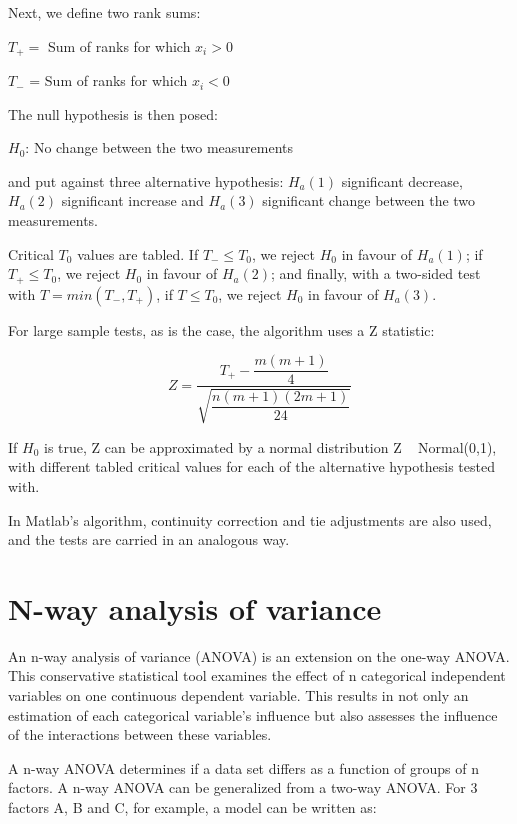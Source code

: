 Next, we define two rank sums:

$T_+ =$ Sum of ranks for which $x_i>0$

$T_-$ = Sum of ranks for which $x_i<0$

The null hypothesis is then posed:

\begin{center}
$H_0$: No change between the two measurements
\end{center} 

and put against three alternative hypothesis: $H_a(1)$ significant decrease, $H_a(2)$ significant increase and $H_a(3)$ significant change between the two measurements.

Critical $T_0$ values are tabled. If $T_- \leq T_0$, we reject $H_0$ in favour of $H_a(1)$; if $T_+ \leq T_0$, we reject $H_0$ in favour of $H_a(2)$; and finally, with a two-sided test with $T=min(T_-, T_+)$, if  $T \leq T_0$, we reject $H_0$ in favour of $H_a(3)$.

For large sample tests, as is the case, the algorithm uses a Z statistic:

\begin{equation}
Z = \dfrac{T_+ - \dfrac{m(m+1)}{4}}{\sqrt{\dfrac{n(m+1)(2m+1)}{24}}}
\end{equation}

If $H_0$ is true, Z can be approximated by a normal distribution Z ~ Normal(0,1), with different tabled critical values for each of the alternative hypothesis tested with.

In Matlab's algorithm, continuity correction and tie adjustments are also used, and the tests are carried in an analogous way.

\section{N-way analysis of variance}
\label{subsec:subcsectionC}

An n-way analysis of variance (ANOVA) is an extension on the one-way ANOVA. This conservative statistical tool examines the effect of n categorical independent variables on one continuous dependent variable. This results in not only an estimation of each categorical variable's influence but also assesses the influence of the interactions between these variables.

A n-way ANOVA determines if a data set differs as a function of groups of n factors. A n-way ANOVA can be generalized from a two-way ANOVA. For 3 factors A, B and C, for example, a model can be written as:

